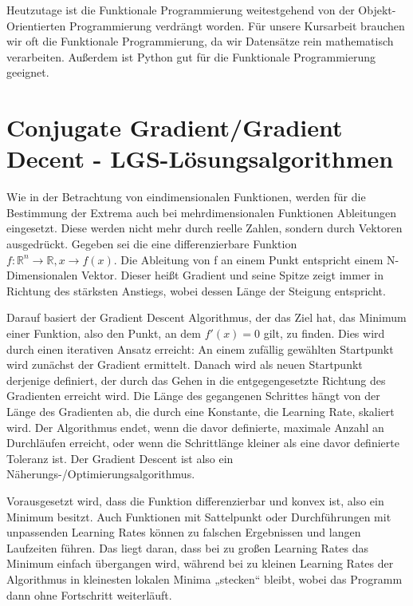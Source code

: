 \documentclass[]{dsadokumentation}
\begin{document}
Heutzutage ist die Funktionale Programmierung weitestgehend von der Objekt-Orientierten Programmierung verdrängt worden. Für unsere Kursarbeit brauchen wir oft die Funktionale Programmierung, da wir Datensätze rein mathematisch verarbeiten. Außerdem ist Python gut für die Funktionale Programmierung geeignet.

\section{Conjugate Gradient/Gradient Decent - LGS-Lösungsalgorithmen}

Wie in der Betrachtung von eindimensionalen Funktionen, werden für die Bestimmung der Extrema auch bei mehrdimensionalen Funktionen Ableitungen eingesetzt. Diese werden nicht mehr durch reelle Zahlen, sondern durch Vektoren ausgedrückt. Gegeben sei die eine differenzierbare Funktion $ f:\mathbb{R}^n \rightarrow \mathbb{R}, x \rightarrow f(x). $ Die Ableitung von f an einem Punkt entspricht einem N-Dimensionalen Vektor. Dieser heißt Gradient und seine Spitze zeigt immer in Richtung des stärksten Anstiegs, wobei dessen Länge der Steigung entspricht.

Darauf basiert der Gradient Descent Algorithmus, der das Ziel hat, das Minimum einer Funktion, also den Punkt, an dem $ f'(x) = 0 $ gilt, zu finden. Dies wird durch einen iterativen Ansatz erreicht: An einem zufällig gewählten Startpunkt wird zunächst der Gradient ermittelt. Danach wird als neuen Startpunkt derjenige definiert, der durch das Gehen in die entgegengesetzte Richtung des Gradienten erreicht wird. Die Länge des gegangenen Schrittes hängt von der Länge des Gradienten ab, die durch eine Konstante, die Learning Rate, skaliert wird. Der Algorithmus endet, wenn die davor definierte, maximale Anzahl an Durchläufen erreicht, oder wenn die Schrittlänge kleiner als eine davor definierte Toleranz ist. Der Gradient Descent ist also ein Näherungs-/Optimierungsalgorithmus.

Vorausgesetzt wird, dass die Funktion differenzierbar und konvex ist, also ein Minimum besitzt. Auch Funktionen mit Sattelpunkt oder Durchführungen mit unpassenden Learning Rates können zu falschen Ergebnissen und langen Laufzeiten führen. Das liegt daran, dass bei zu großen Learning Rates das Minimum einfach übergangen wird, während bei zu kleinen Learning Rates der Algorithmus in kleinesten lokalen Minima „stecken“ bleibt, wobei das Programm dann ohne Fortschritt weiterläuft.
\end{document}
